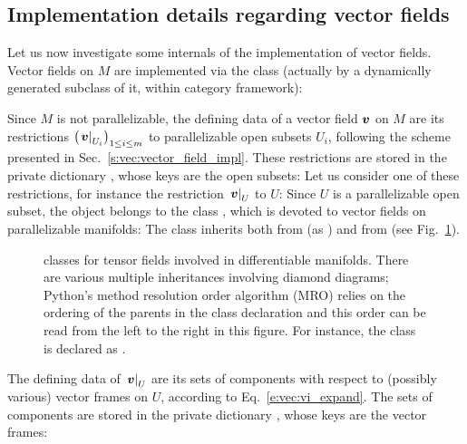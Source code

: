 \subsection{Implementation details regarding vector fields}

Let us now investigate some internals of the implementation of vector fields.
Vector fields on $M$ are implemented via the class
 (actually by a dynamically generated subclass of it, within \Sage{} category
framework):

Since $M$ is not parallelizable, the defining data of a
vector field $\bm{v}$ on $M$ are its restrictions
$\left(\left. \bm{v}\right| _{U_i}\right)_{1\leq i \leq m}$
to parallelizable open subsets $U_i$,
following the scheme presented in Sec.~\ref{s:vec:vector_field_impl}.
These restrictions are stored in the private dictionary , whose keys are
the open subsets:
Let us consider one of these restrictions, for instance the restriction
$\left. \bm{v}\right| _U$ to $U$:
Since $U$ is a parallelizable open subset, the object  belongs
to the class , which is devoted to vector fields
on parallelizable manifolds:
The class  inherits both from
 (as ) and from
 (see Fig.~\ref{f:vec:tensorfield_classes}).
\begin{figure}
\begin{center}

\end{center}
\caption{\label{f:vec:tensorfield_classes}\footnotesize
\Sage{} classes for tensor fields involved in differentiable manifolds.
There are various multiple inheritances involving diamond diagrams;
Python's method resolution order algorithm (MRO) relies on the ordering of the parents
in the class declaration and this order can be read from the left to the right in
this figure. For instance, the class  is declared as
.}
\end{figure}
The defining data of $\left. \bm{v}\right| _U$ are
its sets of components with respect to (possibly various)
vector frames on $U$, according to Eq.~\eqref{e:vec:vi_expand}. The sets of components are stored in the private dictionary , whose keys are the vector frames:
